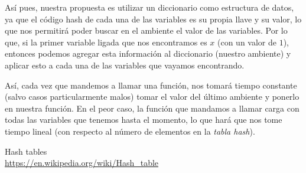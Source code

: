 \documentclass[letterpaper,11pt]{article}
\begin{document}
\begin{enumerate}
\begin{enumerate}
        Así pues, nuestra propuesta es utilizar un diccionario como estructura 
        de datos, ya que el código hash de cada una de las variables es su 
        propia llave y su valor, lo que nos permitirá poder buscar en el 
        ambiente el valor de las variables. Por lo que, si la primer variable 
        ligada que nos encontramos es $x$ (con un valor de $1$), entonces 
        podemos agregar esta información al diccionario (nuestro ambiente) y 
        aplicar esto a cada una de las variables que vayamos encontrando.

        Así, cada vez que mandemos a llamar una función, nos tomará tiempo 
        constante (salvo casos particularmente malos) tomar el valor del último 
        ambiente y ponerlo en nuestra función. En el peor caso, la función que 
        mandamos a llamar carga con todas las variables que tenemos hasta el 
        momento, lo que hará que nos tome tiempo lineal (con respecto al número 
        de elementos en la \textit{tabla hash}).

   \end{enumerate}
\end{enumerate}

\begin{thebibliography}{2}
  Hash tables \\
  \url{https://en.wikipedia.org/wiki/Hash_table}
\end{thebibliography}
\end{document}
